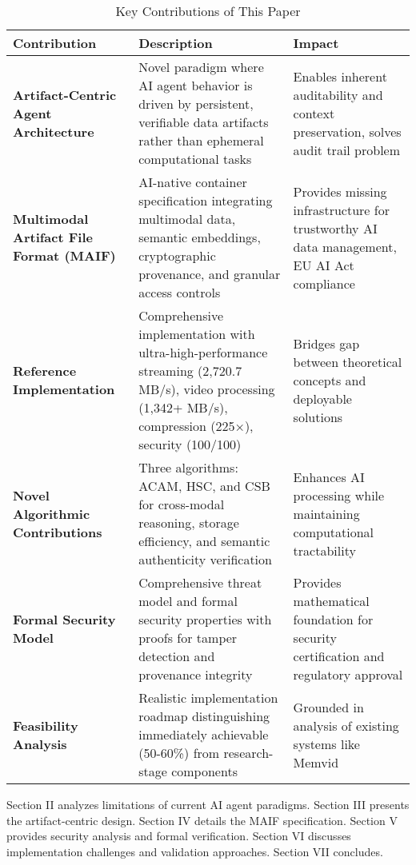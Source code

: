 \documentclass[conference]{IEEEtran}
\begin{document}
\begin{table*}[!t]
\renewcommand{\arraystretch}{1.3}
\caption{Key Contributions of This Paper}
\label{tab:key-contributions}
\centering
\footnotesize
\begin{tabular}{p{3.5cm}p{6cm}p{4.5cm}}
\toprule
\textbf{Contribution} & \textbf{Description} & \textbf{Impact} \\
\midrule
\textbf{Artifact-Centric Agent Architecture} & Novel paradigm where AI agent behavior is driven by persistent, verifiable data artifacts rather than ephemeral computational tasks & Enables inherent auditability and context preservation, solves audit trail problem \\
\textbf{Multimodal Artifact File Format (MAIF)} & AI-native container specification integrating multimodal data, semantic embeddings, cryptographic provenance, and granular access controls & Provides missing infrastructure for trustworthy AI data management, EU AI Act compliance \\
\textbf{Reference Implementation} & Comprehensive implementation with ultra-high-performance streaming (2,720.7 MB/s), video processing (1,342+ MB/s), compression (225×), security (100/100) & Bridges gap between theoretical concepts and deployable solutions \\
\textbf{Novel Algorithmic Contributions} & Three algorithms: ACAM, HSC, and CSB for cross-modal reasoning, storage efficiency, and semantic authenticity verification & Enhances AI processing while maintaining computational tractability \\
\textbf{Formal Security Model} & Comprehensive threat model and formal security properties with proofs for tamper detection and provenance integrity & Provides mathematical foundation for security certification and regulatory approval \\
\textbf{Feasibility Analysis} & Realistic implementation roadmap distinguishing immediately achievable (50-60\%) from research-stage components & Grounded in analysis of existing systems like Memvid \\
\bottomrule
\end{tabular}
\end{table*}


Section II analyzes limitations of current AI agent paradigms. Section III presents the artifact-centric design. Section IV details the MAIF specification. Section V provides security analysis and formal verification. Section VI discusses implementation challenges and validation approaches. Section VII concludes.
\end{document}
